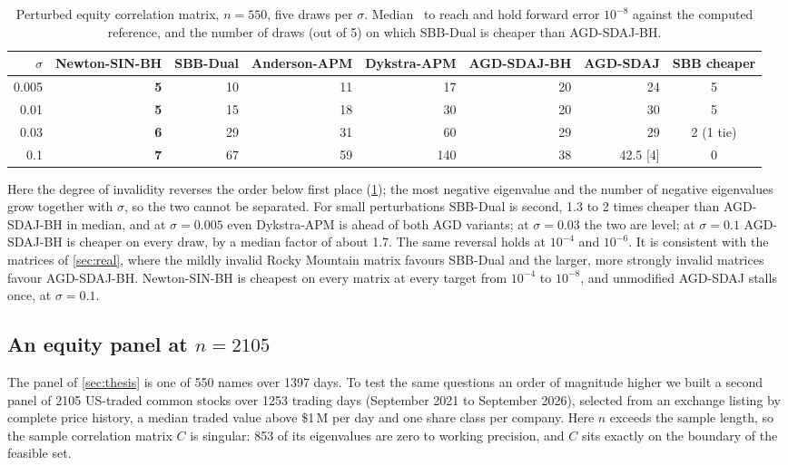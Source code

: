 \begin{table}[t]
\centering
\caption{Perturbed equity correlation matrix, $n=550$, five draws per
$\sigma$. Median \EVDs\ to reach and hold forward error $10^{-8}$ against the
computed reference, and the number of draws (out of 5) on which SBB-Dual is
cheaper than AGD-SDAJ-BH.}
\label{tab:thesispert}
\footnotesize
\setlength{\tabcolsep}{3pt}
\begin{tabular}{rrrrrrrc}
\toprule
$\sigma$ & Newton-SIN-BH & SBB-Dual & Anderson-APM & Dykstra-APM & AGD-SDAJ-BH & AGD-SDAJ & SBB cheaper\\
\midrule
0.005 & \textbf{5} & 10 & 11 & 17  & 20 & 24 & 5\\
0.01  & \textbf{5} & 15 & 18 & 30  & 20 & 30 & 5\\
0.03  & \textbf{6} & 29 & 31 & 60  & 29 & 29 & 2 (1 tie)\\
0.1   & \textbf{7} & 67 & 59 & 140 & 38 & 42.5 \tiny[4] & 0\\
\bottomrule
\end{tabular}
\end{table}

Here the degree of invalidity reverses the order below first place
(\cref{tab:thesispert}); the most negative eigenvalue and the number of
negative eigenvalues grow together with $\sigma$, so the two cannot be
separated. For small perturbations SBB-Dual is second, 1.3 to 2 times cheaper
than AGD-SDAJ-BH in median, and at
$\sigma=0.005$ even Dykstra-APM is ahead of both AGD variants; at
$\sigma=0.03$ the two are level; at
$\sigma=0.1$ AGD-SDAJ-BH is cheaper on every draw, by a median factor of about 1.7.
The same reversal holds at $10^{-4}$ and $10^{-6}$. It is consistent with the
matrices of \cref{sec:real}, where the mildly invalid Rocky Mountain matrix
favours SBB-Dual and the larger, more strongly invalid matrices favour
AGD-SDAJ-BH. Newton-SIN-BH is cheapest on every matrix at every target from
$10^{-4}$ to $10^{-8}$, and unmodified
AGD-SDAJ stalls once, at $\sigma=0.1$.

\subsection{An equity panel at $n=2105$}\label{sec:us2105}
The panel of \cref{sec:thesis} is one of 550 names over 1397 days. To test the
same questions an order of magnitude higher we built a second panel of 2105
US-traded common stocks over 1253 trading days (September 2021 to September
2026), selected from an exchange listing by complete price history, a median
traded value above \$1\,M per day and one share class per company. Here
$n$ exceeds the sample length, so the sample correlation matrix $C$ is singular:
853 of its eigenvalues are zero to working precision, and $C$ sits exactly on
the boundary of the feasible set.

